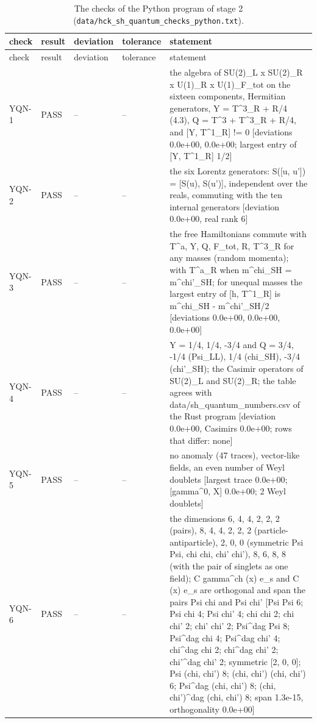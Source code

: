 \documentclass[aps,prd,onecolumn,superscriptaddress,nofootinbib,floatfix,longbibliography]{revtex4-2}
\begin{document}
\begingroup\fontsize{7}{8.5}\selectfont\setlength{\tabcolsep}{3pt}
\begin{longtable}{p{}p{}p{}p{}p{}}
\caption{\label{tab:checks_quantum_python}The checks of the Python program of stage 2 (\texttt{data/hck\_sh\_quantum\_checks\_python.txt}).}\\
\hline\hline
check & result & deviation & tolerance & statement \\ \hline
\endfirsthead
\hline check & result & deviation & tolerance & statement \\ \hline
\endhead
\hline\hline
\endlastfoot
YQN-1 & PASS & -- & -- & the algebra of SU(2)\_L x SU(2)\_R x U(1)\_R x U(1)\_F\_tot on the sixteen components, Hermitian generators, Y = T\textasciicircum{}3\_R + R/4 (4.3), Q = T\textasciicircum{}3 + T\textasciicircum{}3\_R + R/4, and [Y, T\textasciicircum{}1\_R] != 0 [deviations 0.0e+00, 0.0e+00; largest entry of [Y, T\textasciicircum{}1\_R] 1/2] \\
YQN-2 & PASS & -- & -- & the six Lorentz generators: S([u, u']) = [S(u), S(u')], independent over the reals, commuting with the ten internal generators [deviation 0.0e+00, real rank 6] \\
YQN-3 & PASS & -- & -- & the free Hamiltonians commute with T\textasciicircum{}a, Y, Q, F\_tot, R, T\textasciicircum{}3\_R for any masses (random momenta); with T\textasciicircum{}a\_R when m\textasciicircum{}chi\_SH = m\textasciicircum{}chi'\_SH; for unequal masses the largest entry of [h, T\textasciicircum{}1\_R] is \textbar{}m\textasciicircum{}chi\_SH - m\textasciicircum{}chi'\_SH\textbar{}/2 [deviations 0.0e+00, 0.0e+00, 0.0e+00] \\
YQN-4 & PASS & -- & -- & Y = 1/4, 1/4, -3/4 and Q = 3/4, -1/4 (Psi\_LL), 1/4 (chi\_SH), -3/4 (chi'\_SH); the Casimir operators of SU(2)\_L and SU(2)\_R; the table agrees with data/sh\_quantum\_numbers.csv of the Rust program [deviation 0.0e+00, Casimirs 0.0e+00; rows that differ: none] \\
YQN-5 & PASS & -- & -- & no anomaly (47 traces), vector-like fields, an even number of Weyl doublets [largest trace 0.0e+00; [gamma\textasciicircum{}0, X] 0.0e+00; 2 Weyl doublets] \\
YQN-6 & PASS & -- & -- & the dimensions 6, 4, 4, 2, 2, 2 (pairs), 8, 4, 4, 2, 2, 2 (particle-antiparticle), 2, 0, 0 (symmetric Psi Psi, chi chi, chi' chi'), 8, 6, 8, 8 (with the pair of singlets as one field); C gamma\textasciicircum{}ch (x) e\_s and C (x) e\_s are orthogonal and span the pairs Psi chi and Psi chi' [Psi Psi 6; Psi chi 4; Psi chi' 4; chi chi 2; chi chi' 2; chi' chi' 2; Psi\textasciicircum{}dag Psi 8; Psi\textasciicircum{}dag chi 4; Psi\textasciicircum{}dag chi' 4; chi\textasciicircum{}dag chi 2; chi\textasciicircum{}dag chi' 2; chi'\textasciicircum{}dag chi' 2; symmetric [2, 0, 0]; Psi (chi, chi') 8; (chi, chi') (chi, chi') 6; Psi\textasciicircum{}dag (chi, chi') 8; (chi, chi')\textasciicircum{}dag (chi, chi') 8; span 1.3e-15, orthogonality 0.0e+00] \\

\end{longtable}
\end{document}
